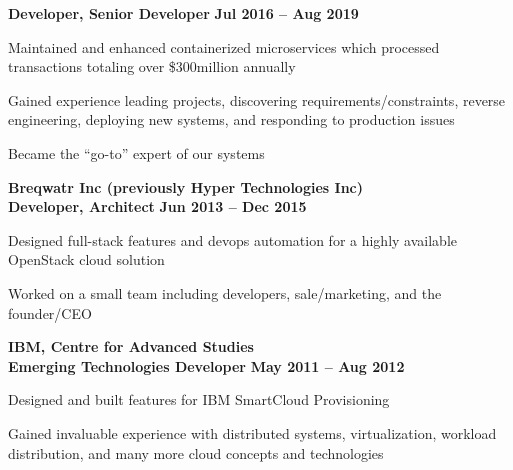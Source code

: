 \documentclass[margin,line]{resume}
\begin{document}
\begin{resume}
    \hspace{2.6mm}\textbf{Developer, Senior Developer} \hfill \textbf{Jul 2016 -- Aug 2019}\vspace{1mm}
    \begin{list2}
        \item Maintained and enhanced containerized microservices which processed transactions totaling over \$300million annually
        \item Gained experience leading projects, discovering requirements/constraints, reverse engineering, deploying new systems, and responding to production issues
        \item Became the “go-to” expert of our systems
    \end{list2}

    \hspace{-3mm}\textbf{\listing Breqwatr Inc (previously Hyper Technologies Inc)} \vspace{2mm}\\\vspace{1mm}
    \hspace{1.2mm}\textbf{Developer, Architect} \hfill \textbf{Jun 2013 -- Dec 2015}\vspace{1mm}
    \begin{list2}
        \item Designed full-stack features and devops automation for a highly available OpenStack cloud solution
        \item Worked on a small team including developers, sale/marketing, and the founder/CEO
    \end{list2}

    \hspace{-3mm}\textbf{\listing IBM, Centre for Advanced Studies}\vspace{2mm}\\\vspace{1mm}
    \hspace{1.2mm}\textbf{Emerging Technologies Developer} \hfill \textbf{May 2011 -- Aug 2012}\vspace{1mm}
    \begin{list2}
        \item Designed and built features for IBM SmartCloud Provisioning
        \item Gained invaluable experience with distributed systems, virtualization, workload distribution, and many more cloud concepts and technologies
    \end{list2}


\end{resume}
\end{document}
